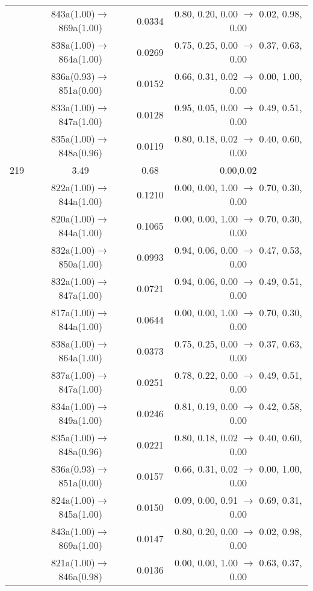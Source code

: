 \documentclass[10pt,a4paper]{article}
\begin{document}
\begin{longtable}{c|c|c|c}
 	& 843a(1.00)$\rightarrow$869a(1.00) &	 0.0334 &	 0.80, 0.20, 0.00 $\rightarrow$ 0.02, 0.98, 0.00 \\ 
 	& 838a(1.00)$\rightarrow$864a(1.00) &	 0.0269 &	 0.75, 0.25, 0.00 $\rightarrow$ 0.37, 0.63, 0.00 \\ 
 	& 836a(0.93)$\rightarrow$851a(0.00) &	 0.0152 &	 0.66, 0.31, 0.02 $\rightarrow$ 0.00, 1.00, 0.00 \\ 
 	& 833a(1.00)$\rightarrow$847a(1.00) &	 0.0128 &	 0.95, 0.05, 0.00 $\rightarrow$ 0.49, 0.51, 0.00 \\ 
 	& 835a(1.00)$\rightarrow$848a(0.96) &	 0.0119 &	 0.80, 0.18, 0.02 $\rightarrow$ 0.40, 0.60, 0.00 \\ 
 \hline219 &	 3.49 &	 0.68 &	 0.00,0.02 \\ 
  	& 822a(1.00)$\rightarrow$844a(1.00) &	 0.1210 &	 0.00, 0.00, 1.00 $\rightarrow$ 0.70, 0.30, 0.00 \\ 
 	& 820a(1.00)$\rightarrow$844a(1.00) &	 0.1065 &	 0.00, 0.00, 1.00 $\rightarrow$ 0.70, 0.30, 0.00 \\ 
 	& 832a(1.00)$\rightarrow$850a(1.00) &	 0.0993 &	 0.94, 0.06, 0.00 $\rightarrow$ 0.47, 0.53, 0.00 \\ 
 	& 832a(1.00)$\rightarrow$847a(1.00) &	 0.0721 &	 0.94, 0.06, 0.00 $\rightarrow$ 0.49, 0.51, 0.00 \\ 
 	& 817a(1.00)$\rightarrow$844a(1.00) &	 0.0644 &	 0.00, 0.00, 1.00 $\rightarrow$ 0.70, 0.30, 0.00 \\ 
 	& 838a(1.00)$\rightarrow$864a(1.00) &	 0.0373 &	 0.75, 0.25, 0.00 $\rightarrow$ 0.37, 0.63, 0.00 \\ 
 	& 837a(1.00)$\rightarrow$847a(1.00) &	 0.0251 &	 0.78, 0.22, 0.00 $\rightarrow$ 0.49, 0.51, 0.00 \\ 
 	& 834a(1.00)$\rightarrow$849a(1.00) &	 0.0246 &	 0.81, 0.19, 0.00 $\rightarrow$ 0.42, 0.58, 0.00 \\ 
 	& 835a(1.00)$\rightarrow$848a(0.96) &	 0.0221 &	 0.80, 0.18, 0.02 $\rightarrow$ 0.40, 0.60, 0.00 \\ 
 	& 836a(0.93)$\rightarrow$851a(0.00) &	 0.0157 &	 0.66, 0.31, 0.02 $\rightarrow$ 0.00, 1.00, 0.00 \\ 
 	& 824a(1.00)$\rightarrow$845a(1.00) &	 0.0150 &	 0.09, 0.00, 0.91 $\rightarrow$ 0.69, 0.31, 0.00 \\ 
 	& 843a(1.00)$\rightarrow$869a(1.00) &	 0.0147 &	 0.80, 0.20, 0.00 $\rightarrow$ 0.02, 0.98, 0.00 \\ 
 	& 821a(1.00)$\rightarrow$846a(0.98) &	 0.0136 &	 0.00, 0.00, 1.00 $\rightarrow$ 0.63, 0.37, 0.00 \\ 

\end{longtable}
\end{document}
